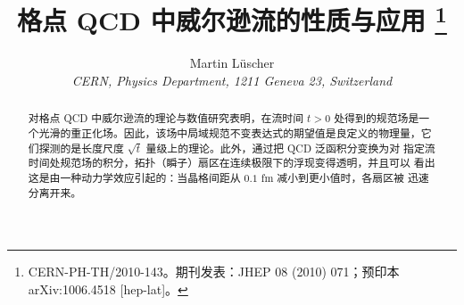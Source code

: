 \documentclass[11pt]{ctexart}
\title{格点 QCD 中威尔逊流的性质与应用%
\thanks{CERN-PH-TH/2010-143。期刊发表：JHEP 08 (2010) 071；预印本 arXiv:1006.4518 [hep-lat]。}}
\author{Martin L\"uscher\\[1ex]
\normalsize\itshape CERN, Physics Department, 1211 Geneva 23, Switzerland}
\date{}
\begin{document}
\maketitle

\begin{abstract}
对格点 QCD 中威尔逊流的理论与数值研究表明，在流时间 $t>0$ 处得到的规范场是一
个光滑的重正化场。因此，该场中局域规范不变表达式的期望值是良定义的物理量，它
们探测的是长度尺度 $\sqrt{t}$ 量级上的理论。此外，通过把 QCD 泛函积分变换为对
指定流时间处规范场的积分，拓扑（瞬子）扇区在连续极限下的浮现变得透明，并且可以
看出这是由一种动力学效应引起的：当晶格间距从 $0.1$ fm 减小到更小值时，各扇区被
迅速分离开来。
\end{abstract}







\end{document}
